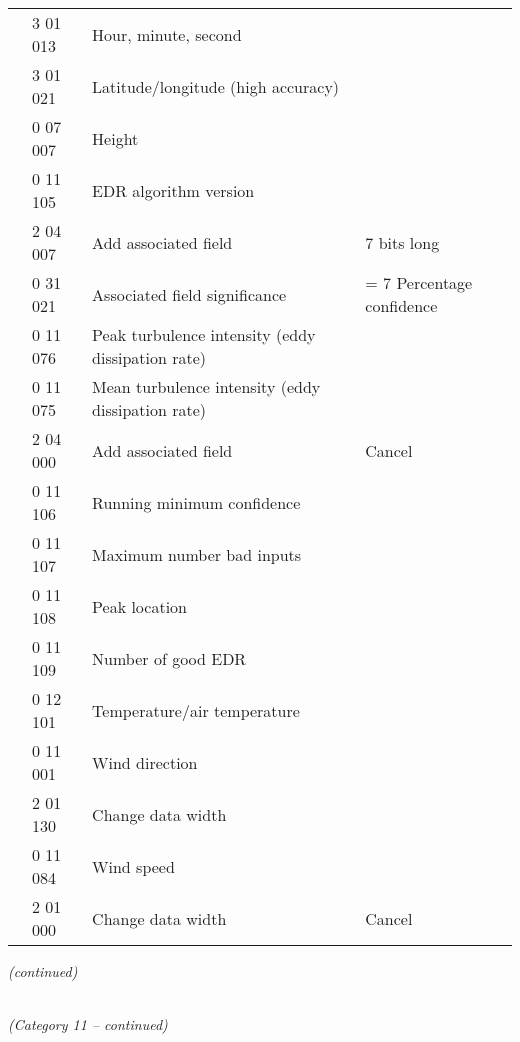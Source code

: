\begin{longtable}[]{@{}llll@{}}
& 3 01 013 & Hour, minute, second &\tabularnewline
& 3 01 021 & Latitude/longitude (high accuracy) &\tabularnewline
& 0 07 007 & Height &\tabularnewline
& 0 11 105 & EDR algorithm version &\tabularnewline
& 2 04 007 & Add associated field & 7 bits long\tabularnewline
& 0 31 021 & Associated field significance & = 7 Percentage confidence\tabularnewline
& 0 11 076 & Peak turbulence intensity (eddy dissipation rate) &\tabularnewline
& 0 11 075 & Mean turbulence intensity (eddy dissipation rate) &\tabularnewline
& 2 04 000 & Add associated field & Cancel\tabularnewline
& 0 11 106 & Running minimum confidence &\tabularnewline
& 0 11 107 & Maximum number bad inputs &\tabularnewline
& 0 11 108 & Peak location &\tabularnewline
& 0 11 109 & Number of good EDR &\tabularnewline
& 0 12 101 & Temperature/air temperature &\tabularnewline
& 0 11 001 & Wind direction &\tabularnewline
& 2 01 130 & Change data width &\tabularnewline
& 0 11 084 & Wind speed &\tabularnewline
& 2 01 000 & Change data width & Cancel\tabularnewline
\bottomrule
\end{longtable}

\emph{(continued)}

\emph{\\
(Category 11 -- continued)}

